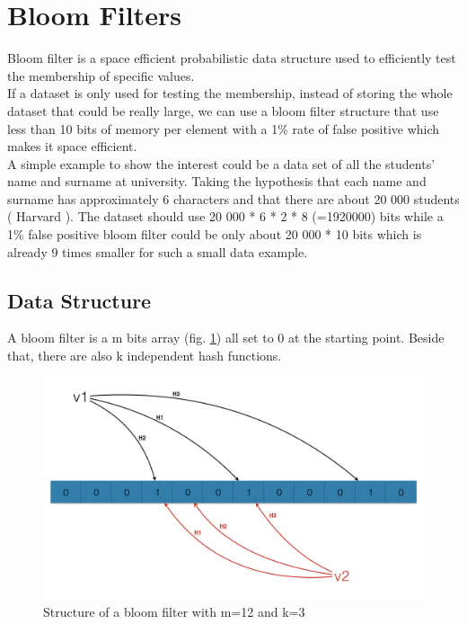 \documentclass{eplmastersthesis}
\begin{document}
\section{Bloom Filters}
Bloom filter is a space efficient probabilistic data structure  used to efficiently test the membership of specific values.\\
If a dataset is only used for testing the membership, instead of storing the whole dataset that could be really large, we can use a bloom filter structure that use less than 10 bits of memory per element with a 1\% rate of false positive which makes it space efficient.\\
A simple example to show the interest could be a data set of all the students' name and surname at university. Taking the hypothesis that each name and surname has approximately 6 characters and that there are about 20 000 students ( Harvard ). The dataset should use 20 000 * 6 * 2 * 8 (=1920000) bits while a 1\% false positive bloom filter could be only about 20 000 * 10 bits which is already 9 times smaller for such a small data example.\\

\subsection{Data Structure}
A bloom filter is a m bits array (fig. \ref{bloom-1}) all set to 0 at the starting point. Beside that, there are also k independent hash functions. 

\begin{figure}[h!]
	\begin{center}
		\includegraphics[scale=0.3]{res/bloom-1}
		\caption{Structure of a bloom filter with m=12 and k=3}
		\label{bloom-1}
	\end{center}
\end{figure}
\end{document}
